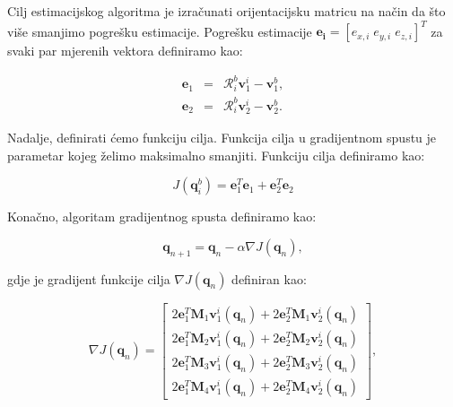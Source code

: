 \documentclass[times, utf8, diplomski, numeric]{templates/template}
\begin{document}
{{{{                Cilj estimacijskog algoritma je izračunati orijentacijsku matricu na način da što više smanjimo pogrešku estimacije. Pogrešku estimacije $\boldsymbol{e_i} = \left[e_{x,i} \; e_{y,i} \; e_{z,i}\right]^T$ za svaki par mjerenih vektora definiramo kao:

                \begin{equation}
                \begin{array}{rcl}
                    \boldsymbol{e}_1 & = & \mathcal{R}_i^b \boldsymbol{v}_1^i - \boldsymbol{v}_1^b, \\
                    \boldsymbol{e}_2 & = & \mathcal{R}_i^b \boldsymbol{v}_2^i - \boldsymbol{v}_2^b. 
                \end{array}
                \end{equation} 

                Nadalje, definirati ćemo funkciju cilja. Funkcija cilja u gradijentnom spustu je parametar kojeg želimo maksimalno smanjiti. Funkciju cilja definiramo kao:

                \begin{equation}
                    J(\boldsymbol{q}_i^b) = \boldsymbol{e}_1^T \boldsymbol{e}_1 + \boldsymbol{e}_2^T \boldsymbol{e}_2
                \end{equation}

                Konačno, algoritam gradijentnog spusta definiramo kao:

                \begin{equation}
                \label{eq:grad_des}
                    \boldsymbol{q}_{n+1} = \boldsymbol{q}_n - \alpha\nabla J(\boldsymbol{q}_n),
                \end{equation}

                gdje je gradijent funkcije cilja $\nabla J(\boldsymbol{q}_n)$ definiran kao:

                \begin{equation}
                    \nabla J(\boldsymbol{q}_n) = 
                    \begin{bmatrix}
                        2 \boldsymbol{e}_1^T \boldsymbol{M}_1 \boldsymbol{v}_1^i(\boldsymbol{q}_n) + 2 \boldsymbol{e}_2^T \boldsymbol{M}_1 \boldsymbol{v}_2^i(\boldsymbol{q}_n) \\
                        2 \boldsymbol{e}_1^T \boldsymbol{M}_2 \boldsymbol{v}_1^i(\boldsymbol{q}_n) + 2 \boldsymbol{e}_2^T \boldsymbol{M}_2 \boldsymbol{v}_2^i(\boldsymbol{q}_n) \\
                        2 \boldsymbol{e}_1^T \boldsymbol{M}_3 \boldsymbol{v}_1^i(\boldsymbol{q}_n) + 2 \boldsymbol{e}_2^T \boldsymbol{M}_3 \boldsymbol{v}_2^i(\boldsymbol{q}_n) \\
                        2 \boldsymbol{e}_1^T \boldsymbol{M}_4 \boldsymbol{v}_1^i(\boldsymbol{q}_n) + 2 \boldsymbol{e}_2^T \boldsymbol{M}_4 \boldsymbol{v}_2^i(\boldsymbol{q}_n)
                    \end{bmatrix}
                    ,
                \end{equation}

}}}}
\end{document}
